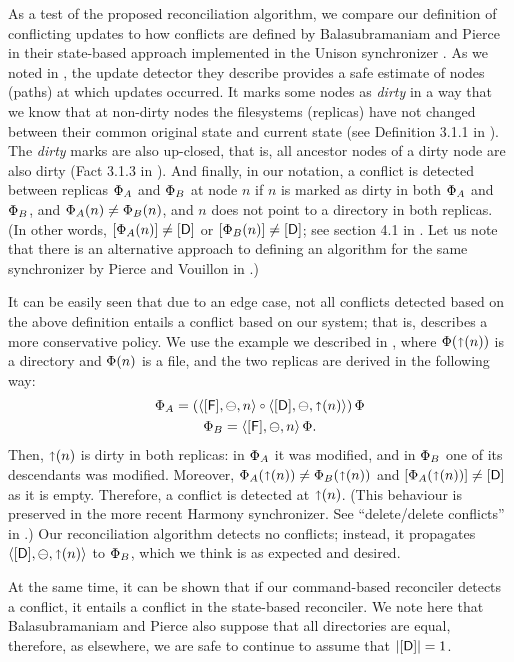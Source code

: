 As a test of the proposed reconciliation algorithm, 
we compare our definition of conflicting
updates to how conflicts are defined by Balasubramaniam and Pierce
in their state-based approach implemented in the Unison synchronizer \cite{BP}.
As we noted in \cite{NREC}, the update detector they describe provides a safe estimate of nodes
(paths) at which updates occurred.
It marks some nodes as \emph{dirty} in a way that we know that at non-dirty nodes
the filesystems (replicas) have not changed between their common original state and current state
(see Definition 3.1.1 in \cite{BP}).
The \emph{dirty} marks are also up-closed, that is, all ancestor nodes of a dirty node
are also dirty (Fact 3.1.3 in \cite{BP}).
And finally, in our notation, 
a conflict is detected between replicas $\Phi_A$ and $\Phi_B$ at node $n$
if $n$ is marked as dirty in both $\Phi_A$ and $\Phi_B$, and
$\Phi_A(n)\neq\Phi_B(n)$, and $n$ does not point to a directory in both replicas.
(In other words, 
$[\Phi_A(n)]\neq[\mathsf{D}]$ or $[\Phi_B(n)]\neq[\mathsf{D}]$; see section 4.1 in \cite{BP}.
Let us note that there is an alternative approach to defining an algorithm for
the same synchronizer by Pierce and Vouillon in \cite{PV}.)

It can be easily seen that due to an edge case, 
not all conflicts detected based on the above definition
entails a conflict based on our system; that is, \cite{BP} describes a more
conservative policy.
We use the example we described in \cite{NREC},
where $\Phi(\mathord{\shortuparrow}({n}))$ is a directory and $\Phi(n)$ is a file, and
the two replicas are derived in the following way:
\begin{gather*}
\FS_A = (\cfba{n} \cc \cdba{\pn}) \aFS \\
\FS_B = \cfba{n} \aFS.
\end{gather*}
Then, $\mathord{\shortuparrow}({n})$ is dirty in both replicas:
in $\Phi_A$ it was modified, and in $\Phi_B$ one of its descendants was modified.
Moreover, $\Phi_A(\mathord{\shortuparrow}({n}))\neq\Phi_B(\mathord{\shortuparrow}({n}))$ and $[\Phi_A(\mathord{\shortuparrow}({n}))]\neq[\mathsf{D}]$ as it is empty.
Therefore, a conflict is detected at $\mathord{\shortuparrow}({n})$.
(This behaviour is preserved in the more recent Harmony synchronizer.
See ``delete/delete conflicts'' in \cite{PSG,FGKPS}.)
Our reconciliation algorithm detects no conflicts;
instead, it propagates $\langle{[\mathsf{D}],\ominus,\mathord{\shortuparrow}({n})}\rangle$ to $\Phi_B$, which we think is as expected
and desired.

At the same time, it can be shown that if our command-based reconciler
detects a conflict, it entails a conflict in the state-based reconciler.
We note here that Balasubramaniam and Pierce also suppose that all directories are equal,
therefore, as elsewhere, we are safe to continue to assume that $|[\mathsf{D}]|=1$.

